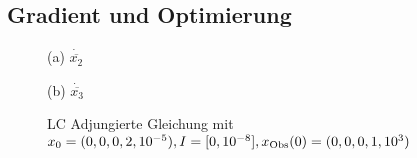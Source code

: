 \subsection{Gradient und Optimierung}
\begin{figure}[H]
\footnotesize
\begin{minipage}[b]{0.49\linewidth}
\centering

\caption*{(a) $\dot{\overline{x_2}}$}
\end{minipage}
\begin{minipage}[b]{0.49\linewidth}
\centering

\caption*{(b) $\dot{\overline{x_3}}$}
\end{minipage}
\caption{LC Adjungierte Gleichung mit $x_0=(0,0,0,2,10^{-5}),I=[0,10^{-8}], x_{\text{Obs}}(0) = (0,0,0,1,10^3)$}
\label{fig:lcAdjointEqRHS}
\end{figure}


